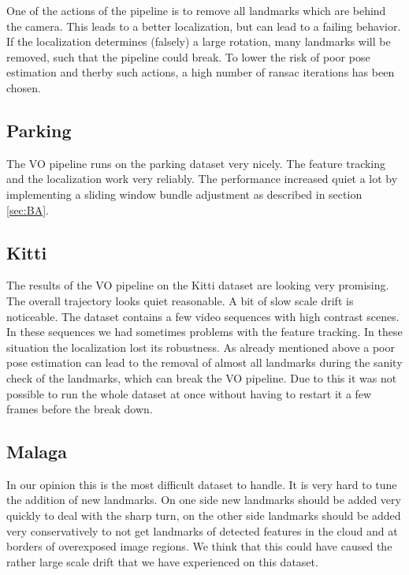 \documentclass{article}
\begin{document}
%
One of the actions of the pipeline is to remove all landmarks which are behind the camera.
%
This leads to a better localization, but can lead to a failing behavior.
%
If the localization determines (falsely) a large rotation, many landmarks will be removed, such that the pipeline could break.
%
To lower the risk of poor pose estimation and therby such actions, a high number of ransac iterations has been chosen.
%

\subsection{Parking}
The VO pipeline runs on the parking dataset very nicely. The feature tracking and the localization work very reliably. The performance increased quiet a lot by implementing a sliding window bundle adjustment as described in section \ref{sec:BA}.

\subsection{Kitti}
The results of the VO pipeline on the Kitti dataset are looking very promising. The overall trajectory looks quiet reasonable. A bit of slow scale drift is noticeable.
The dataset contains a few video sequences with high contrast scenes. In these sequences we had sometimes problems with the feature tracking. In these situation the localization lost its robustness. As already mentioned above a poor pose estimation can lead to the removal of almost all landmarks during the sanity check of the landmarks, which can break the VO pipeline. Due to this it was not possible to run the whole dataset at once without having to restart it a few frames before the break down.

\subsection{Malaga}
In our opinion this is the most difficult dataset to handle. It is very hard to tune the addition of new landmarks. On one side new landmarks should be added very quickly to deal with the sharp turn, on the other side landmarks should be added very conservatively to not get landmarks of detected features in the cloud and at borders of overexposed image regions. We think that this could have caused the rather large scale drift that we have experienced on this dataset.
\end{document}
